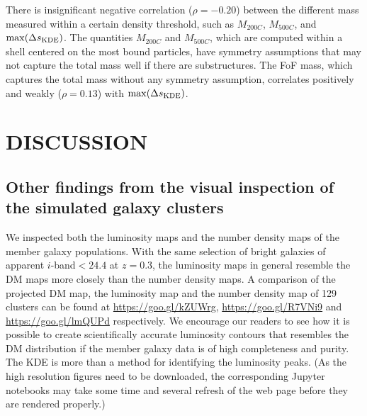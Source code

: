 There is insignificant negative correlation ($\rho = -0.20$) between the different mass 
measured within a certain density threshold, such as $M_{200C}$, $M_{500C}$, 
and $\max(\Delta s_{\rm KDE})$. The quantities $M_{200C}$ and $M_{500C}$, which
are computed within a shell centered on the most bound particles, have
symmetry assumptions that may not capture the total mass well if there are substructures. 
The FoF mass, which
captures the total mass without any symmetry assumption, correlates positively
and weakly 
($\rho = 0.13$) with $\max(\Delta s_{\rm KDE})$. 



% 
 
 
 
\section{DISCUSSION}\label{sec:discussion}

\subsection{Other findings from the visual inspection of the simulated galaxy clusters}
We inspected both the luminosity maps and the
number density maps of the member galaxy populations.
With the same selection of bright galaxies of apparent $i$-band$ < 24.4$ at
$z=0.3$, the luminosity maps in general resemble the DM maps more closely than 
the number density maps.
A comparison of the projected 
DM map, the luminosity map and the number density map of 129 clusters 
can be found at \href{https://goo.gl/kZUWrg}{https://goo.gl/kZUWrg}, 
\href{https://goo.gl/R7VNi9}{https://goo.gl/R7VNi9} and
\href{https://goo.gl/lmQUPd}{https://goo.gl/lmQUPd} respectively. 
We encourage our readers to see how it is possible
to create scientifically accurate luminosity contours that resembles 
the DM distribution if the member galaxy
data is of high completeness and purity. The KDE is more than a method for
identifying the luminosity peaks.
(As the high resolution figures need to be downloaded, the 
corresponding Jupyter notebooks may take some time and several refresh of the
web page before they are rendered properly.)

